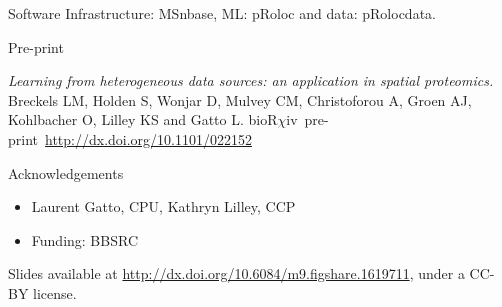 \documentclass[bigger]{beamer}
\newcommand{\Rpackage}[1]{{\mbox{\normalfont\textsf{#1}}}}
\begin{document}
  \begin{frame}

   \begin{block}{Software}
     \vspace{.1cm}
    Infrastructure: \Rpackage{MSnbase}, ML: \Rpackage{pRoloc} and data: \Rpackage{pRolocdata}.
    \vspace{.2cm}
  \end{block}
   
  \begin{block}{Pre-print}
  \begin{small}
    \textit{Learning from heterogeneous data sources: an application
      in spatial proteomics.} Breckels LM, Holden S, Wonjar D, Mulvey
    CM, Christoforou A, Groen AJ, Kohlbacher O, Lilley KS and Gatto L.
    bioR$\chi$iv~pre-print~\url{http://dx.doi.org/10.1101/022152}
    \vspace{.2cm}
    \end{small}
  \end{block}
  
  \begin{block}{Acknowledgements}
    \begin{itemize}
    \item Laurent Gatto, CPU, Kathryn Lilley, CCP
    \item Funding: BBSRC
    \end{itemize}
  \end{block}
  
  \footnotesize {Slides available at
    \url{http://dx.doi.org/10.6084/m9.figshare.1619711},
    under a CC-BY license}.
  
  \end{frame}
\end{document}
